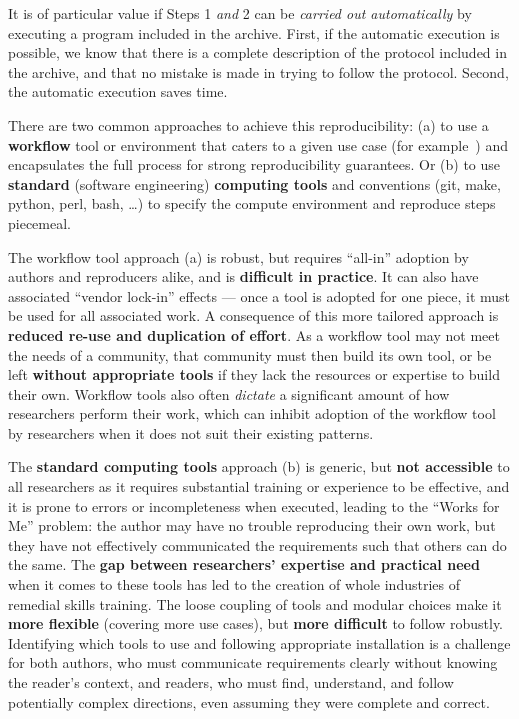 It is of particular value if Steps 1 \emph{and} 2 can be \emph{carried out
  automatically} by executing a program included in the
archive. First, if the automatic execution is possible, we know that there is a
complete description of the protocol included in the archive, and that no
mistake is made in trying to follow the protocol. Second, the automatic
execution saves time.

There are two common approaches to achieve this reproducibility: (a) to use a
\textbf{workflow} tool or environment that caters to a given use case (for
example~\cite{Afgan2018,Mlder2021,reana2019})
and encapsulates the full process for strong reproducibility guarantees.
Or (b) to use \textbf{standard} (software engineering) \textbf{computing tools} and conventions
(git, make, python, perl, bash, \ldots)
to specify the compute environment and reproduce steps piecemeal.

The workflow tool approach (a) is robust, but requires ``all-in'' adoption by authors and reproducers alike,
and is \textbf{difficult in practice}. It can also have associated ``vendor lock-in'' effects
--- once a tool is adopted for one piece, it must be used for all associated work.
A consequence of this more tailored approach is \textbf{reduced re-use and duplication of effort}.
As a workflow tool may not meet the needs of a community,
that community must then build its own tool, or be left \textbf{without appropriate tools}
if they lack the resources or expertise to build their own.
Workflow tools also often \emph{dictate} a significant amount of how researchers perform their work,
which can inhibit adoption of the workflow tool by researchers
when it does not suit their existing patterns.

The \textbf{standard computing tools} approach (b) is generic, but \textbf{not accessible} to all researchers
as it requires substantial training or experience to be effective,
and it is prone to errors or incompleteness when executed,
leading to the ``Works for Me'' problem:
the author may have no trouble reproducing their own work,
but they have not effectively communicated the requirements such that others can do the same.
The \textbf{gap between researchers' expertise and practical need} when it comes to these tools has led to the creation
of whole industries of remedial skills training.
The loose coupling of tools and modular choices make it \textbf{more flexible} (covering more use cases),
but \textbf{more difficult} to follow robustly.
Identifying which tools to use and following appropriate installation is a challenge
for both authors, who must communicate requirements clearly without knowing the reader's context,
and readers, who must find, understand, and follow potentially complex directions, even assuming they were
complete and correct.

